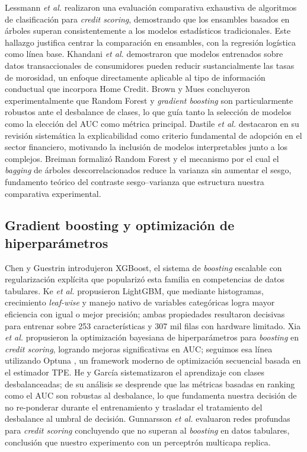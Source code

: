 \documentclass[journal]{IEEEtran}
\begin{document}
Lessmann \textit{et al.} \cite{lessmann2015} realizaron una evaluación comparativa exhaustiva de algoritmos de clasificación para \textit{credit scoring}, demostrando que los ensambles basados en árboles superan consistentemente a los modelos estadísticos tradicionales. Este hallazgo justifica centrar la comparación en ensambles, con la regresión logística como línea base. Khandani \textit{et al.} \cite{khandani2010} demostraron que modelos entrenados sobre datos transaccionales de consumidores pueden reducir sustancialmente las tasas de morosidad, un enfoque directamente aplicable al tipo de información conductual que incorpora Home Credit. Brown y Mues \cite{brown2012} concluyeron experimentalmente que Random Forest y \textit{gradient boosting} son particularmente robustos ante el desbalance de clases, lo que guía tanto la selección de modelos como la elección del AUC como métrica principal. Dastile \textit{et al.} \cite{dastile2020} destacaron en su revisión sistemática la explicabilidad como criterio fundamental de adopción en el sector financiero, motivando la inclusión de modelos interpretables junto a los complejos. Breiman \cite{breiman2001} formalizó Random Forest y el mecanismo por el cual el \textit{bagging} de árboles descorrelacionados reduce la varianza sin aumentar el sesgo, fundamento teórico del contraste sesgo--varianza que estructura nuestra comparativa experimental.

\subsection{Gradient boosting y optimización de hiperparámetros}

Chen y Guestrin \cite{chen2016} introdujeron XGBoost, el sistema de \textit{boosting} escalable con regularización explícita que popularizó esta familia en competencias de datos tabulares. Ke \textit{et al.} \cite{ke2017} propusieron LightGBM, que mediante histogramas, crecimiento \textit{leaf-wise} y manejo nativo de variables categóricas logra mayor eficiencia con igual o mejor precisión; ambas propiedades resultaron decisivas para entrenar sobre 253 características y 307 mil filas con hardware limitado. Xia \textit{et al.} \cite{xia2017} propusieron la optimización bayesiana de hiperparámetros para \textit{boosting} en \textit{credit scoring}, logrando mejoras significativas en AUC; seguimos esa línea utilizando Optuna \cite{akiba2019}, un framework moderno de optimización secuencial basada en el estimador TPE. He y García \cite{he2009} sistematizaron el aprendizaje con clases desbalanceadas; de su análisis se desprende que las métricas basadas en ranking como el AUC son robustas al desbalance, lo que fundamenta nuestra decisión de no re-ponderar durante el entrenamiento y trasladar el tratamiento del desbalance al umbral de decisión. Gunnarsson \textit{et al.} \cite{gunnarsson2021} evaluaron redes profundas para \textit{credit scoring} concluyendo que no superan al \textit{boosting} en datos tabulares, conclusión que nuestro experimento con un perceptrón multicapa replica.
\end{document}
